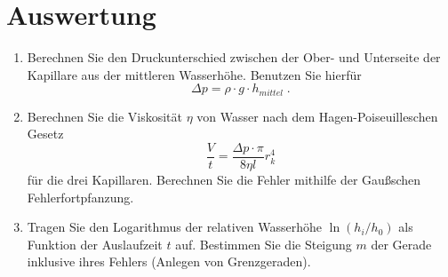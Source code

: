 \section{Auswertung} 

\begin{enumerate}
 \item Berechnen Sie den Druckunterschied zwischen der Ober- und Unterseite der Kapillare aus der mittleren Wasserhöhe. Benutzen Sie hierfür
  \begin{equation}
		\Delta p = \rho\cdot g\cdot h_{mittel}\; .  
  \end{equation}
 \item \label{Aufg:Vis1}
 Berechnen Sie die Viskosität $\eta$ von Wasser nach dem Hagen-Poiseuilleschen Gesetz
  \begin{equation} \label{eq:HP}
   \frac{V}{t} = \frac{\Delta p\cdot\pi}{8\eta l}r_k^4
  \end{equation}
 für die drei Kapillaren. Berechnen Sie die Fehler mithilfe der Gaußschen Fehlerfortpfanzung.
 \item Tragen Sie den Logarithmus der relativen Wasserhöhe $\ln(h_i/h_0)$ als Funktion der Auslaufzeit $t$ auf. Bestimmen Sie die Steigung $m$ der Gerade inklusive ihres Fehlers (Anlegen von Grenzgeraden).\\


\end{enumerate}
